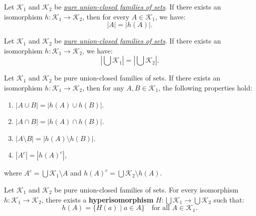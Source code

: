\documentclass{beamer}
\begin{document}
\begin{frame}
	\begin{theorem}[Cardinality]
		Let \( \mathcal{K}_1 \) and \( \mathcal{K}_2 \) be \textit{\hyperref[def:pure_collection]{pure union-closed families of sets}}. If there exists an isomorphism \( h: \mathcal{K}_1 \to \mathcal{K}_2 \), then for every \( A \in \mathcal{K}_1 \), we have:
		\[
			|A| = |h(A)|.
		\]
	\end{theorem}
	\pause
	\vfill
	\begin{corollary}
		Let \( \mathcal{K}_1 \) and \( \mathcal{K}_2 \) be \textit{\hyperref[def:pure_collection]{pure union-closed families of sets}}. If there exists an isomorphism \( h: \mathcal{K}_1 \to \mathcal{K}_2 \), we have:
		\[
			\left| \bigcup\mathcal{K}_1 \right| = \left| \bigcup\mathcal{K}_2 \right|.
		\]
	\end{corollary}

\end{frame}

\begin{frame}
	\begin{corollary}
		Let \( \mathcal{K}_1 \) and \( \mathcal{K}_2 \) be pure union-closed families of sets. If there exists an isomorphism \( h: \mathcal{K}_1 \to \mathcal{K}_2 \), then for any \(A, B \in \mathcal{K}_1\), the following properties hold:
		\begin{enumerate}
			\item \(|A \cup B| = |h(A) \cup h(B)|\).
			\item \(|A \cap B| = |h(A) \cap h(B)|\).
			\item \(|A \setminus B| = |h(A) \setminus h(B)|\).
			\item \(|A^c| = |h{(A)}^c|\),
		\end{enumerate}
		where \(A^c = \bigcup \mathcal{K}_1 \setminus A\) and
		\(h{(A)}^c = {\bigcup \mathcal{K}_2} \setminus h(A)\).

	\end{corollary}
\end{frame}

\begin{frame}

	\begin{theorem}
		Let \( \mathcal{K}_1 \) and \( \mathcal{K}_2 \) be pure union-closed families of sets. For every isomorphism \( h: \mathcal{K}_1 \to \mathcal{K}_2 \), there exists a \textbf{hyperisomorphism} \( H: \bigcup \mathcal{K}_1 \to \bigcup \mathcal{K}_2 \) such that:
		\[
			h(A) = \{ H(a) \mid a \in A \} \quad \text{for all } A \in \mathcal{K}_1.
		\]
	\end{theorem}

\end{frame}
\end{document}
